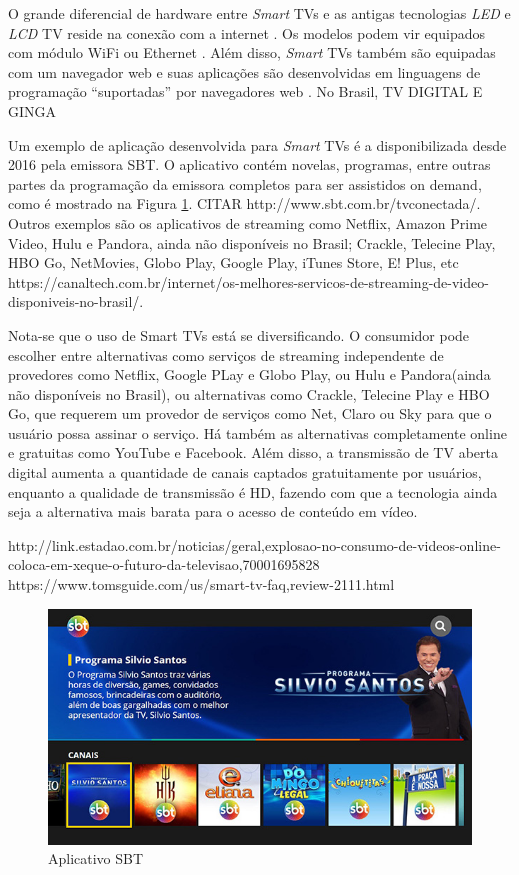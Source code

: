 O grande diferencial de hardware entre \emph{Smart} TVs e as antigas tecnologias \emph{LED} e \emph{LCD} TV reside na conexão com a internet \cite{differencebetween}. Os modelos podem vir equipados com módulo WiFi ou Ethernet \cite{tomsguid:everythingsmart}.
Além disso, \emph{Smart} TVs também são equipadas com um navegador web e suas aplicações são desenvolvidas em linguagens de programação ``suportadas'' por navegadores web \cite{mautilus:specificationsforsmart}. No Brasil, TV DIGITAL E GINGA

Um exemplo de aplicação desenvolvida para \emph{Smart} TVs é a disponibilizada desde 2016 pela emissora SBT. O aplicativo contém novelas, programas, entre outras partes da programação da emissora completos para ser assistidos on demand, como é mostrado na Figura \ref{fig:sbt_app}. CITAR http://www.sbt.com.br/tvconectada/. Outros exemplos são os aplicativos de streaming como Netflix, Amazon Prime Video, Hulu e Pandora, ainda não disponíveis no Brasil; Crackle, Telecine Play, HBO Go, NetMovies, Globo Play, Google Play, iTunes Store, E! Plus, etc https://canaltech.com.br/internet/os-melhores-servicos-de-streaming-de-video-disponiveis-no-brasil/.

Nota-se que o uso de Smart TVs está se diversificando. O consumidor pode escolher entre alternativas como serviços de streaming independente de provedores como Netflix, Google PLay e Globo Play, ou Hulu e Pandora(ainda não disponíveis no Brasil), ou alternativas como Crackle, Telecine Play e HBO Go, que requerem um provedor de serviços como Net, Claro ou Sky para que o usuário possa assinar o serviço. Há também as alternativas completamente online e gratuitas como YouTube e Facebook. Além disso, a transmissão de TV aberta digital aumenta a quantidade de canais captados gratuitamente por usuários, enquanto a qualidade de transmissão é HD, fazendo com que a tecnologia ainda seja a alternativa mais barata para o acesso de conteúdo em vídeo.

http://link.estadao.com.br/noticias/geral,explosao-no-consumo-de-videos-online-coloca-em-xeque-o-futuro-da-televisao,70001695828
https://www.tomsguide.com/us/smart-tv-faq,review-2111.html

\begin{figure}
	\includegraphics[width=\textwidth]{img/sbt_app.jpg}
	\caption{Aplicativo SBT}
	\label{fig:sbt_app}
\end{figure}

